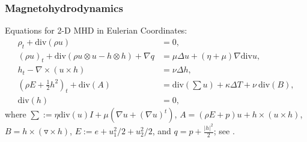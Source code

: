 \documentclass[mathserif]{beamer} %
\newcommand{\grad}{\triangledown}
\begin{document}
\begin{frame}
    \frametitle{Magnetohydrodynamics}
Equations for 2-D MHD in Eulerian Coordinates:
\begin{align*}
    \rho_t + \mathrm{div}(\rho u) &= 0,\nonumber\\
    (\rho u)_t + \mathrm{div}(\rho u \otimes u-h\otimes h)+\nabla q &= \mu \Delta u + (\eta + \mu) \nabla \mathrm{div} u ,\nonumber\\
    h_t - \nabla \times(u\times h)&= \nu \Delta h ,\\
(\rho E + \frac{1}{2}h^2)_t + \textrm{div}(A)&=\textrm{div}\left(\sum u\right)+\kappa \Delta T + \nu \ \textrm{div}(B),\nonumber\\
    \textrm{div}(h) &= 0,\nonumber 
\end{align*}
\noindent 
where $ \sum:= \eta \mathrm{div}(u)I+\mu(\nabla u+(\nabla u)^t)$, $A = (\rho E+p)u+h\times(u\times h)$, $B= h\times(\grad \times h)$, $E:= e+u_1^2/2+u_2^2/2$, and $q = p + \frac{|h|^2}{2}$; see \cite{Ba,C,Da,J,Kaw}. %


\end{frame}
\end{document}
